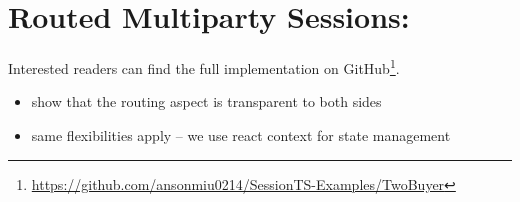 \section{Routed Multiparty Sessions: }
\label{section:evaltwobuyer}

Interested readers can find the full implementation on
GitHub\footnote{\url{https://github.com/ansonmiu0214/SessionTS-Examples/TwoBuyer}}.

\begin{itemize}
\item show that the routing aspect is transparent to both sides
\item same flexibilities apply -- we use react context for state management
\end{itemize}
